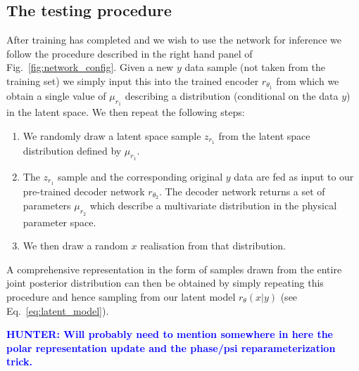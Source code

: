 \documentclass[%
showpacs,
nofootinbib,
 amsmath,amssymb,
 aps,
 twocolumn,
 prl,
 reprint,
floatfix,
]{revtex4-1}
\newcommand{\hunter}[1]{\textbf{\textcolor{blue}{HUNTER: #1}}}
\begin{document}
\subsection{The testing procedure}
%
%
After training has completed and we wish to use the network for inference we
follow the procedure described in the right hand panel of
Fig.~\ref{fig:network_config}. Given a new $y$ data sample (not taken from the
training set) we simply input this into the trained encoder $r_{\theta_1}$ from
which we obtain a single value of $\mu_{r_1}$ describing a distribution
(conditional on the data $y$) in the latent space. We then repeat the following
steps:

%
%
\begin{enumerate}
%
\item We randomly draw a latent space sample $z_{r_1}$ from the latent space
distribution defined by $\mu_{r_1}$.
%
\item The $z_{r_1}$ sample and the corresponding original $y$ data are fed as input to our
pre-trained decoder network $r_{\theta_2}$. The decoder network returns a set
of parameters $\mu_{r_2}$ which describe a multivariate distribution in the physical
parameter space.
%
\item We then draw a random $x$ realisation from that distribution.
%
\end{enumerate}
%

%
%
A comprehensive representation in the form of samples drawn from the entire
joint posterior distribution can then be obtained by simply repeating this
procedure and hence sampling from our latent model $r_{\theta}(x|y)$ (see
Eq.~\ref{eq:latent_model}).

\hunter{Will probably need to mention somewhere in here the polar representation 
update and the phase/psi reparameterization trick.}

\end{document}
